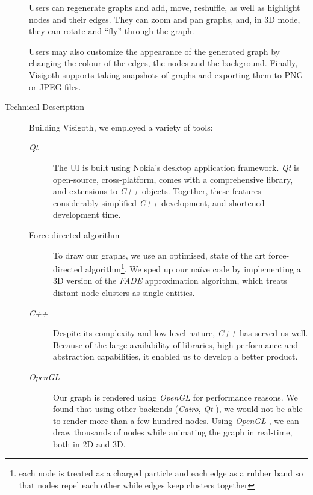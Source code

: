 \documentclass[a4paper,11pt]{article}
\newcommand{\buzz}[1]{\emph{#1}}
\newcommand{\Qt}{\buzz{Qt} }
\newcommand{\Cpp}{\buzz{C++} }
\newcommand{\OpenGL}{\buzz{OpenGL} }
\newcommand{\FADE}{\buzz{FADE} }
\begin{document}
\begin{description}
  Users can regenerate graphs and add, move, reshuffle, as well as
  highlight nodes and their edges. They can zoom and pan graphs, and,
  in 3D mode, they can rotate and ``fly'' through the graph.

  Users may also customize the appearance of the generated graph by
  changing the colour of the edges, the nodes and the background.
  Finally, Visigoth supports taking snapshots of graphs and exporting
  them to PNG or JPEG files.

\item[Technical Description]

  Building Visigoth, we employed a variety of tools:

  \begin{description}
    \item[\Qt] The UI is built using Nokia's desktop application
      framework. \Qt is open-source, cross-platform, comes with a
      comprehensive library, and extensions to \Cpp objects. Together,
      these features considerably simplified \Cpp development, and
      shortened development time.

    \item[Force-directed algorithm] To draw our graphs, we use an
      optimised, state of the art force-directed
      algorithm\footnote{each node is treated as a charged particle
        and each edge as a rubber band so that nodes repel each other
        while edges keep clusters together}. We sped up our na\"ive
      code by implementing a 3D version of the \FADE approximation
      algorithm, which treats distant node clusters as single
      entities.

    \item[\Cpp] Despite its complexity and low-level nature, \Cpp has
      served us well. Because of the large availability of libraries,
      high performance and abstraction capabilities, it enabled us to
      develop a better product.

    \item[\OpenGL] Our graph is rendered using \OpenGL for performance
      reasons. We found that using other backends (\buzz{Cairo}, \Qt),
      we would not be able to render more than a few hundred
      nodes. Using \OpenGL, we can draw thousands of nodes while
      animating the graph in real-time, both in 2D and 3D.
  \end{description}


\end{description}
\end{document}
